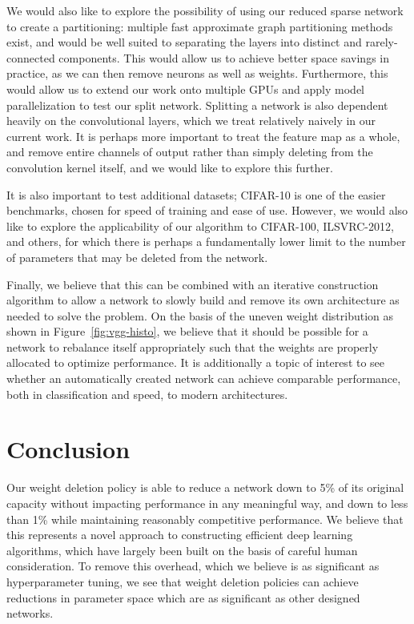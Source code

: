 \documentclass[10pt,twocolumn,letterpaper]{article}
\begin{document}
We would also like to explore the possibility of using our reduced sparse network to create a partitioning: multiple fast approximate graph partitioning methods exist, and would be well suited to separating the layers into distinct and rarely-connected components.
This would allow us to achieve better space savings in practice, as we can then remove neurons as well as weights.
Furthermore, this would allow us to extend our work onto multiple GPUs and apply model parallelization to test our split network.
Splitting a network is also dependent heavily on the convolutional layers, which we treat relatively naively in our current work.
It is perhaps more important to treat the feature map as a whole, and remove entire channels of output rather than simply deleting from the convolution kernel itself, and we would like to explore this further.

It is also important to test additional datasets; CIFAR-10 is one of the easier benchmarks, chosen for speed of training and ease of use.
However, we would also like to explore the applicability of our algorithm to CIFAR-100, ILSVRC-2012, and others, for which there is perhaps a fundamentally lower limit to the number of parameters that may be deleted from the network.

Finally, we believe that this can be combined with an iterative construction algorithm to allow a network to slowly build and remove its own architecture as needed to solve the problem.
On the basis of the uneven weight distribution as shown in Figure~\ref{fig:vgg-histo}, we believe that it should be possible for a network to rebalance itself appropriately such that the weights are properly allocated to optimize performance.
It is additionally a topic of interest to see whether an automatically created network can achieve comparable performance, both in classification and speed, to modern architectures.

\section{Conclusion}
Our weight deletion policy is able to reduce a network down to 5\% of its original capacity without impacting performance in any meaningful way, and down to less than 1\% while maintaining reasonably competitive performance.
We believe that this represents a novel approach to constructing efficient deep learning algorithms, which have largely been built on the basis of careful human consideration.
To remove this overhead, which we believe is as significant as hyperparameter tuning, we see that weight deletion policies can achieve reductions in parameter space which are as significant as other designed networks.
\end{document}
